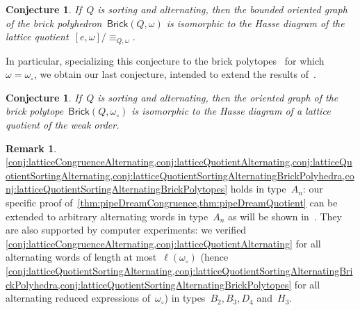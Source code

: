 \documentclass[reqno]{amsart}
\newtheorem{conjecture}[theorem]{Conjecture}
\theoremstyle{definition}
\newtheorem{remark}[theorem]{Remark}
\newcommand{\wo}{\omega_\circ} %
\newcommand{\brickPolyhedron}{\mathsf{Brick}} %
\begin{document}
\begin{conjecture}
\label{conj:latticeQuotientSortingAlternatingBrickPolyhedra}
If~$Q$ is sorting and alternating, then the bounded oriented graph of the brick polyhedron~$\brickPolyhedron(Q, \omega)$ is isomorphic to the Hasse diagram of the lattice quotient~$[e, \omega]/\equiv_{Q, \omega}$.
\end{conjecture}

In particular, specializing this conjecture to the brick polytopes~\cite{PilaudSantos-brickPolytope, PilaudStump-brickPolytope} for which~$\omega = \wo$, we obtain our last conjecture, intended to extend the results of~\cite{Pilaud-brickAlgebra}.

\begin{conjecture}
\label{conj:latticeQuotientSortingAlternatingBrickPolytopes}
If~$Q$ is sorting and alternating, then the oriented graph of the brick polytope~$\brickPolyhedron(Q, \wo)$ is isomorphic to the Hasse diagram of a lattice quotient of the weak order.
\end{conjecture}

\begin{remark}
\cref{conj:latticeCongruenceAlternating,conj:latticeQuotientAlternating,conj:latticeQuotientSortingAlternating,conj:latticeQuotientSortingAlternatingBrickPolyhedra,conj:latticeQuotientSortingAlternatingBrickPolytopes} holds in type~$A_n$: our specific proof of~\cref{thm:pipeDreamCongruence,thm:pipeDreamQuotient} can be extended to arbitrary alternating words in type~$A_n$ as will be shown in~\cite{Cartier}.
They are also supported by computer experiments: we verified \cref{conj:latticeCongruenceAlternating,conj:latticeQuotientAlternating} for all alternating words of length at most~$\ell(\wo)$ (hence \cref{conj:latticeQuotientSortingAlternating,conj:latticeQuotientSortingAlternatingBrickPolyhedra,conj:latticeQuotientSortingAlternatingBrickPolytopes} for all alternating reduced expressions of~$\wo$) in types~$B_2, B_3, D_4$ and~$H_3$.
\end{remark}
\end{document}
